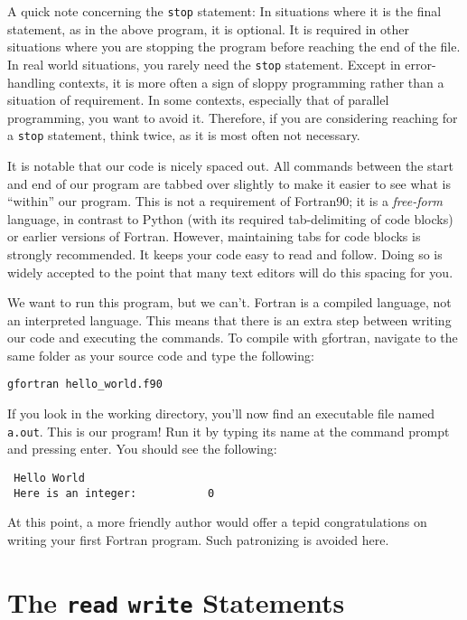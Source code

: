 \documentclass[11pt, letterpaper]{article}
\begin{document}
A quick note concerning the {\tt stop} statement: In situations where it is the
final statement, as in the above program, it is optional.  It is required in
other situations where you are stopping the program before reaching the end
of the file.  In real world situations, you rarely need the {\tt stop}
statement.  Except in error-handling contexts, it is more often a sign of
sloppy programming rather than a situation of requirement.  In some contexts,
especially that of parallel programming, you want to avoid it.  Therefore,
if you are considering reaching for a {\tt stop} statement, think twice, as it
is most often not necessary.

It is notable that our code is nicely spaced out.  All commands
between the start and end of our program are tabbed over slightly to make it
easier to see what is ``within'' our program.  This is not a requirement of
Fortran90; it is a \emph{free-form} language, in contrast to Python
(with its required tab-delimiting of code blocks) or earlier versions of
Fortran.  However, maintaining tabs for code blocks is strongly recommended.
It keeps your code easy to read and follow.  Doing so is widely accepted to
the point that many text editors will do this spacing for you.

We want to run this program, but we can't.  Fortran is a compiled language,
not an interpreted language.  This means that there is an extra step between
writing our code and executing the commands.  To compile with gfortran,
navigate to the same folder as your source code and type the following:
\begin{verbatim}
gfortran hello_world.f90
\end{verbatim}

If you look in the working directory, you'll now find an executable file
named {\tt a.out}.  This is our program!  Run it by typing its name at the
command prompt and pressing enter.  You should see the following:

\begin{verbatim}
 Hello World
 Here is an integer:           0
\end{verbatim}

At this point, a more friendly author would offer a tepid congratulations on
writing your first Fortran program.  Such patronizing is avoided here.

\section{The {\tt read} {\tt write} Statements}
\end{document}
